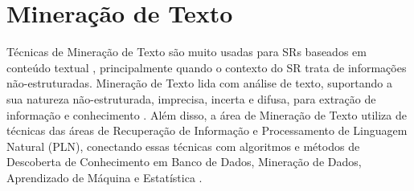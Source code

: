 \documentclass[
    12pt,                %
    oneside,            %
    a4paper,            %
    english,            %
    brazil                %
    ]{abntex2ppgsi}
\begin{document}







\chapter{Mineração de Texto}
\label{sec:mintexto}

Técnicas de Mineração de Texto são muito usadas para SRs baseados em conteúdo textual \cite{Lops2011}, principalmente quando o contexto do SR trata de informações não-estruturadas. Mineração de Texto lida com análise de texto, suportando a sua natureza não-estruturada, imprecisa, incerta e difusa, para extração de informação e conhecimento \cite{Hotho2005}.
Além disso, a área de Mineração de Texto utiliza de técnicas das áreas de Recuperação de Informação e Processamento de Linguagem Natural (PLN), conectando essas técnicas com algoritmos e métodos de Descoberta de Conhecimento em Banco de Dados, Mineração de Dados, Aprendizado de Máquina e Estatística \cite{Hotho2005}.
\end{document}
